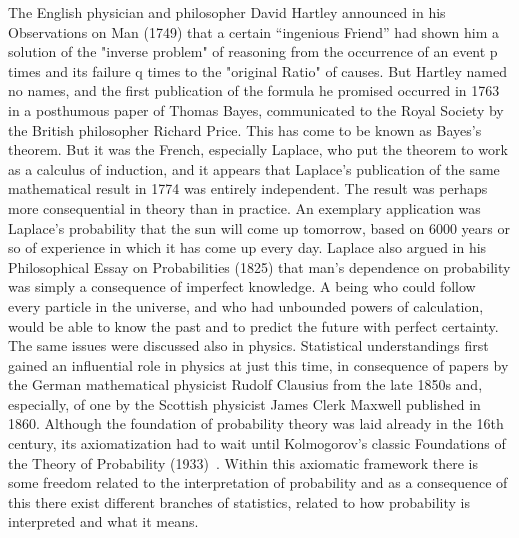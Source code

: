 The English physician and philosopher David Hartley announced in his Observations on Man (1749) that a certain “ingenious Friend” had shown him a solution of the "inverse problem" of reasoning from the occurrence of an event p times and its failure q times to the "original Ratio" of causes. But Hartley named no names, and the first publication of the formula he promised occurred in 1763 in a posthumous paper of Thomas Bayes, communicated to the Royal Society by the British philosopher Richard Price. This has come to be known as Bayes's theorem. But it was the French, especially Laplace, who put the theorem to work as a calculus of induction, and it appears that Laplace's publication of the same mathematical result in 1774 was entirely independent. The result was perhaps more consequential in theory than in practice. An exemplary application was Laplace's probability that the sun will come up tomorrow, based on 6000 years or so of experience in which it has come up every day. Laplace also argued in his Philosophical Essay on Probabilities (1825) that man's dependence on probability was simply a consequence of imperfect knowledge. A being who could follow every particle in the universe, and who had unbounded powers of calculation, would be able to know the past and to predict the future with perfect certainty. The same issues were discussed also in physics. Statistical understandings first gained an influential role in physics at just this time, in consequence of papers by the German mathematical physicist Rudolf Clausius from the late 1850s and, especially, of one by the Scottish physicist James Clerk Maxwell published in 1860. \newline
Although the foundation of probability theory was laid already in the 16th century, its axiomatization had to wait until Kolmogorov's classic Foundations of the Theory of Probability (1933)~\citep{kolmogorov1950foundations}. Within this axiomatic framework there is some freedom related to the interpretation of probability and as a consequence of this there exist different branches of statistics, related to how probability is interpreted and what it means. 